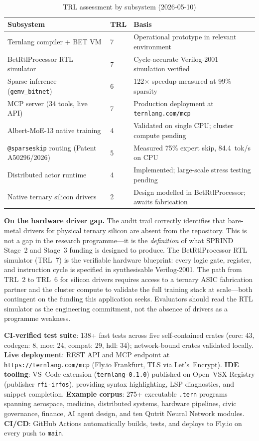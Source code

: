 \documentclass[journal,10pt,twocolumn]{IEEEtran}
\begin{document}
\begin{table}[h]
\centering
\small
\caption{TRL assessment by subsystem (2026-05-10)}
\label{tab:trl}
\begin{tabular}{lll}
\toprule
Subsystem & TRL & Basis \\
\midrule
Ternlang compiler + BET VM & 7 & Operational prototype in relevant environment \\
BetRtlProcessor RTL simulator & 7 & Cycle-accurate Verilog-2001 simulation verified \\
Sparse inference (\texttt{gemv\_bitnet}) & 6 & 122$\times$ speedup measured at 99\% sparsity \\
MCP server (34 tools, live API) & 7 & Production deployment at \texttt{ternlang.com/mcp} \\
Albert-MoE-13 native training & 4 & Validated on single CPU; cluster compute pending \\
\texttt{@sparseskip} routing (Patent A50296/2026) & 5 & Measured 75\% expert skip, 84.4~tok/s on CPU \\
Distributed actor runtime & 4 & Implemented; large-scale stress testing pending \\
Native ternary silicon drivers & 2 & Design modelled in BetRtlProcessor; awaits fabrication \\
\bottomrule
\end{tabular}
\end{table}

\noindent\textbf{On the hardware driver gap.}
The audit trail correctly identifies that bare-metal drivers for physical
ternary silicon are absent from the repository. This is not a gap in the
research programme---it is the \emph{definition} of what SPRIND Stage~2
and Stage~3 funding is designed to produce. The BetRtlProcessor RTL
simulator (TRL~7) is the verifiable hardware blueprint: every logic gate,
register, and instruction cycle is specified in synthesisable Verilog-2001.
The path from TRL~2 to TRL~6 for silicon drivers requires access to a
ternary ASIC fabrication partner and the cluster compute to validate the
full training stack at scale---both contingent on the funding this
application seeks. Evaluators should read the RTL simulator as the
engineering commitment, not the absence of drivers as a programme weakness.

\noindent\textbf{CI-verified test suite}: 138+ fast tests across five
self-contained crates (core: 43, codegen: 8, moe: 24, compat: 29, hdl: 34);
network-bound crates validated locally. \textbf{Live deployment}: REST API
and MCP endpoint at \texttt{https://ternlang.com/mcp} (Fly.io Frankfurt, TLS
via Let's~Encrypt). \textbf{IDE tooling}: VS~Code extension
(\texttt{ternlang-0.1.0}) published on Open~VSX Registry (publisher
\texttt{rfi-irfos}), providing syntax highlighting, LSP diagnostics, and
snippet completion. \textbf{Example corpus}: 275+ executable \texttt{.tern}
programs spanning aerospace, medicine, distributed systems, hardware
pipelines, civic governance, finance, AI agent design, and ten Qutrit Neural
Network modules. \textbf{CI/CD}: GitHub Actions automatically builds, tests,
and deploys to Fly.io on every push to \texttt{main}.
\end{document}
